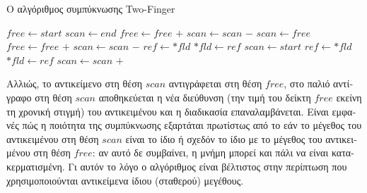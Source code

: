 \begin{greek}
\begin{algorithm}[H]
  \caption{Ο αλγόριθμος συμπύκνωσης Two-Finger}
  \label{alg:mrkcmp1}
  \begin{algorithmic}[1]
      \State {}
      \State {}
    \EndProcedure
    \Statex
      \State $free \gets start$
      \State $scan \gets end$
          \State {}
          \State $free \gets free$ $+$  
        \EndWhile
          \State $scan \gets scan$ $-$  
        \EndWhile
          \State {}
          \State {}
          \State $scan \gets free$ 
          \State $free \gets free$ $+$ 
          \State $scan \gets scan$ $-$ 
        \EndIf
      \EndWhile
    \EndProcedure
    \Statex
       
        \State $ref \gets *fld$
          \State $*fld \gets ref$ %
        \EndIf
      \EndFor
      \State $scan \gets start$
       
          \State $ref \gets *fld$
            \State $*fld \gets ref$ 
          \EndIf
        \EndFor
        \State $scan \gets scan$ $+$  
      \EndWhile
    \EndProcedure
  \end{algorithmic}
\end{algorithm}

Αλλιώς, το αντικείμενο στη 
θέση $scan$ αντιγράφεται στη θέση $free$, στο παλιό αντίγραφο στη θέση $scan$ αποθηκεύεται 
η νέα διεύθυνση (την τιμή του δείκτη $free$ εκείνη τη χρονική στιγμή) του αντικειμένου και 
η διαδικασία επαναλαμβάνεται. Είναι εμφανές πώς η ποιότητα της συμπύκνωσης εξαρτάται 
πρωτίστως από το εάν το μέγεθος του αντικειμένου στη θέση $scan$ είναι το ίδιο ή σχεδόν το 
ίδιο με το μέγεθος του αντικειμένου στη θέση $free$: αν αυτό δε συμβαίνει, η μνήμη μπορεί 
και πάλι να είναι κατακερματισμένη. Γι αυτόν το λόγο ο αλγόριθμος είναι βέλτιστος στην 
περίπτωση που χρησιμοποιούνται αντικείμενα ίδιου (σταθερού) μεγέθους.


\end{greek}
